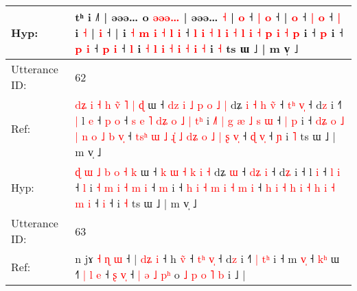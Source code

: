 \documentclass[10pt]{article}
\DeclareRobustCommand{\hl}[1]{{\textcolor{red}{#1}}}
\begin{document}
\begin{longtable}{ll}
Hyp: & tʰ i ˩˥ | əəə…\hl{}\hl{}\hl{}\hl{}\hl{}\hl{}\hl{}\hl{}\hl{} o\hl{}\hl{}\hl{}\hl{}\hl{}\hl{}\hl{}\hl{}\hl{}\hl{}\hl{}\hl{}\hl{} \hl{}\hl{ə}\hl{ə}\hl{ə}\hl{…} | əəə…\hl{}\hl{}\hl{}\hl{}\hl{}\hl{}\hl{}\hl{}\hl{}\hl{}\hl{} \hl{˧} |\hl{}\hl{} \hl{o} ˧ \hl{}\hl{|} \hl{}\hl{o} ˧\hl{} |\hl{}\hl{}\hl{}\hl{} \hl{o} ˧ \hl{|} \hl{o} ˧ \hl{|} i \hl{˧} |\hl{}\hl{} \hl{i} ˧\hl{}\hl{}\hl{}\hl{}\hl{}\hl{}\hl{}\hl{}\hl{}\hl{}\hl{}\hl{}\hl{}\hl{}\hl{}\hl{}\hl{}\hl{}\hl{}\hl{}\hl{}\hl{}\hl{}\hl{}\hl{}\hl{} |\hl{}\hl{}\hl{} i\hl{}\hl{}\hl{} \hl{˧} \hl{m} \hl{i} \hl{˧} \hl{l} \hl{}\hl{i} ˧ \hl{}\hl{}\hl{l} \hl{i} \hl{˧} \hl{}\hl{l} \hl{i} \hl{}\hl{}\hl{˧} \hl{l} \hl{i} \hl{˧} \hl{p} \hl{i} \hl{˧} \hl{}\hl{p} i ˧ \hl{}\hl{p} i ˧ \hl{p} \hl{}\hl{i} ˧ \hl{p} \hl{i} ˧ \hl{}\hl{l} i \hl{˧} \hl{l} \hl{i} \hl{˧} \hl{i} \hl{˧} \hl{i} \hl{˧} i \hl{˧} ts ɯ ˩ | m v̩ ˩
 \\
\midrule
Utterance ID: & 62 \\
Ref: & \hl{d}\hl{ʑ}\hl{ }\hl{i} \hl{˧} \hl{h} \hl{v}\hl{̃} \hl{˥} \hl{|} \hl{ɖ} ɯ ˧\hl{ }\hl{d}\hl{z} \hl{i} \hl{˩} \hl{p} \hl{o} \hl{˩} \hl{|} dʑ\hl{ }\hl{i}\hl{ }\hl{˧}\hl{ }\hl{h} \hl{v}\hl{̃} ˧ \hl{t}\hl{ʰ} \hl{v}\hl{̩} ˧ d\hl{z} i ˧\hl{˥}\hl{ }\hl{|} l \hl{e} ˧ \hl{p} \hl{o} ˧\hl{ }\hl{s}\hl{ }\hl{e}\hl{ }\hl{˥}\hl{ }\hl{d}\hl{ʑ}\hl{ }\hl{o}\hl{ }\hl{˩}\hl{ }\hl{|} \hl{t}\hl{ʰ} i\hl{ }\hl{˩}\hl{˥} \hl{|} \hl{g} \hl{æ} \hl{˩} \hl{s} \hl{ɯ} ˧\hl{ }\hl{|} \hl{p} i ˧\hl{ }\hl{d}\hl{ʑ} \hl{o} \hl{˩} \hl{|} \hl{n} \hl{o} \hl{˩} \hl{b} \hl{v}\hl{̩} ˧ \hl{t}\hl{s}\hl{ʰ} \hl{ɯ} \hl{˩} \hl{ɻ}\hl{̍} \hl{˩} \hl{d}\hl{ʑ} \hl{o} \hl{˩} \hl{|} \hl{ʂ} \hl{v}\hl{̩} ˧\hl{ }\hl{ɖ} \hl{v}\hl{̩} ˧\hl{ }\hl{ɲ} i \hl{˥} ts ɯ ˩ | m v̩ ˩
 \\
Hyp: & \hl{}\hl{}\hl{}\hl{ɖ} \hl{ɯ} \hl{˩} \hl{}\hl{b} \hl{o} \hl{˧} \hl{k} ɯ ˧\hl{}\hl{}\hl{} \hl{k} \hl{ɯ} \hl{˧} \hl{k} \hl{i} \hl{˧} dʑ\hl{}\hl{}\hl{}\hl{}\hl{}\hl{} \hl{}\hl{ɯ} ˧ \hl{d}\hl{ʑ} \hl{}\hl{i} ˧ d\hl{ʑ} i ˧\hl{}\hl{}\hl{} l \hl{i} ˧ \hl{l} \hl{i} ˧\hl{}\hl{}\hl{}\hl{}\hl{}\hl{}\hl{}\hl{}\hl{}\hl{}\hl{}\hl{}\hl{}\hl{}\hl{} \hl{}\hl{l} i\hl{}\hl{}\hl{} \hl{˧} \hl{m} \hl{i} \hl{˧} \hl{m} \hl{i} ˧\hl{}\hl{} \hl{m} i ˧\hl{}\hl{}\hl{} \hl{h} \hl{i} \hl{˧} \hl{m} \hl{i} \hl{˧} \hl{m} \hl{}\hl{i} ˧ \hl{}\hl{}\hl{h} \hl{i} \hl{˧} \hl{}\hl{h} \hl{i} \hl{}\hl{˧} \hl{h} \hl{i} \hl{˧} \hl{m} \hl{}\hl{i} ˧\hl{}\hl{} \hl{}\hl{i} ˧\hl{}\hl{} i \hl{˧} ts ɯ ˩ | m v̩ ˩
 \\
\midrule
Utterance ID: & 63 \\
Ref: & n jɤ\hl{ }\hl{˧}\hl{ }\hl{ɳ}\hl{ }\hl{ɯ} ˧ |\hl{ }\hl{d}\hl{ʑ} \hl{i} ˧ h \hl{v}\hl{̃} ˧ \hl{t}\hl{ʰ} \hl{v}\hl{̩} ˧ d\hl{z} i ˧\hl{˥}\hl{ }\hl{|} \hl{t}\hl{ʰ} i ˧ m \hl{v}\hl{̩} ˧ \hl{k}\hl{ʰ} ɯ ˧\hl{˥}\hl{ }\hl{|} \hl{l} \hl{e} ˧ \hl{ʂ} \hl{v}\hl{̩} ˧\hl{ }\hl{|}\hl{ }\hl{ə}\hl{ }\hl{˩}\hl{ }\hl{p}\hl{ʰ} o\hl{ }\hl{˩}\hl{ }\hl{p} \hl{o} \hl{˥}\hl{ }\hl{b} i ˩ |

\end{longtable}
\end{document}
